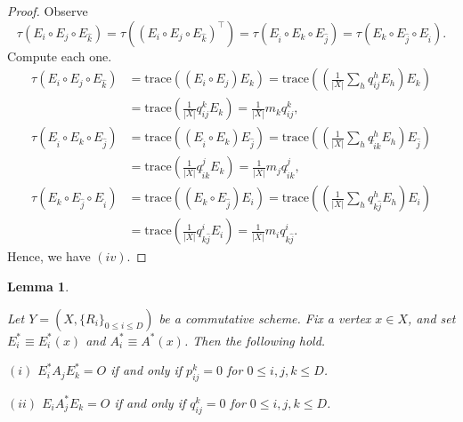 \documentclass[
]{book}
\newtheorem{lemma}{Lemma}[chapter]
\theoremstyle{definition}
\theoremstyle{definition}
\theoremstyle{definition}
\theoremstyle{definition}
\theoremstyle{remark}
\begin{document}
\begin{proof}
Observe
\[\tau(E_i\circ E_j \circ E_{\hat{k}}) = \tau((E_i\circ E_j\circ E_{\hat{k}})^\top) = \tau(E_{\hat{i}}\circ E_k \circ E_{\hat{j}}) = \tau(E_k\circ E_{\hat{j}}\circ E_{\hat{i}}).\]
Compute each one.
\begin{align}
\tau(E_i\circ E_j \circ E_{\hat{k}}) & = \mathrm{trace}((E_i\circ E_j)E_k) = \mathrm{trace}\left(\left(\frac{1}{|X|}\sum_{h} q^h_{ij}E_h\right)E_k\right)\\
& = \mathrm{trace}\left(\frac{1}{|X|} q^k_{ij}E_k\right) = \frac{1}{|X|}m_kq^k_{ij},\\
\tau(E_{\hat{i}}\circ E_k \circ E_{\hat{j}}) & = \mathrm{trace}((E_{\hat{i}}\circ E_k)E_{\hat{j}}) = \mathrm{trace}\left(\left(\frac{1}{|X|}\sum_{h} q^h_{\hat{i}k}E_h\right)E_{\hat{j}}\right)\\
& = \mathrm{trace}\left(\frac{1}{|X|} q^j_{\hat{i}k}E_k\right) = \frac{1}{|X|}m_jq^j_{\hat{i}k},\\
\tau(E_k\circ E_{\hat{j}}\circ E_{\hat{i}}) & = \mathrm{trace}((E_k\circ E_{\hat{j}})E_i) = \mathrm{trace}\left(\left(\frac{1}{|X|}\sum_{h} q^h_{k\hat{j}}E_h\right)E_i\right)\\
& = \mathrm{trace}\left(\frac{1}{|X|} q^i_{k\hat{j}}E_i\right) = \frac{1}{|X|}m_iq^i_{k\hat{j}}.
\end{align}
Hence, we have \((iv)\).

\end{proof}

\begin{lemma}
\protect\hypertarget{lem:vanishing-condition}{}\label{lem:vanishing-condition}

Let \(Y = (X, \{R_i\}_{0\leq i\leq D})\) be a commutative scheme. Fix a vertex \(x\in X\), and set \(E^*_i\equiv E^*_i(x)\) and \(A^*_i \equiv A^*(x)\).
Then the following hold.

\((i)\) \(E^*_iA_jE^*_k = O\) if and only if \(p^k_{ij} = 0\) for \(0\leq i,j,k\leq D\).

\((ii)\) \(E_iA^*_jE_k = O\) if and only if \(q^k_{ij} = 0\) for \(0\leq i,j,k\leq D\).

\end{lemma}
\end{document}
